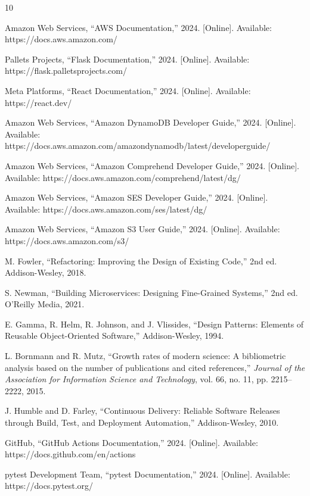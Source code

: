 \documentclass[conference]{IEEEtran}
\begin{document}
\begin{thebibliography}{10}

Amazon Web Services, ``AWS Documentation,'' 2024. [Online]. Available: https://docs.aws.amazon.com/

Pallets Projects, ``Flask Documentation,'' 2024. [Online]. Available: https://flask.palletsprojects.com/

Meta Platforms, ``React Documentation,'' 2024. [Online]. Available: https://react.dev/

Amazon Web Services, ``Amazon DynamoDB Developer Guide,'' 2024. [Online]. Available: https://docs.aws.amazon.com/amazondynamodb/latest/developerguide/

Amazon Web Services, ``Amazon Comprehend Developer Guide,'' 2024. [Online]. Available: https://docs.aws.amazon.com/comprehend/latest/dg/

Amazon Web Services, ``Amazon SES Developer Guide,'' 2024. [Online]. Available: https://docs.aws.amazon.com/ses/latest/dg/

Amazon Web Services, ``Amazon S3 User Guide,'' 2024. [Online]. Available: https://docs.aws.amazon.com/s3/

M. Fowler, ``Refactoring: Improving the Design of Existing Code,'' 2nd ed. Addison-Wesley, 2018.

S. Newman, ``Building Microservices: Designing Fine-Grained Systems,'' 2nd ed. O'Reilly Media, 2021.

E. Gamma, R. Helm, R. Johnson, and J. Vlissides, ``Design Patterns: Elements of Reusable Object-Oriented Software,'' Addison-Wesley, 1994.

L. Bornmann and R. Mutz, ``Growth rates of modern science: A bibliometric analysis based on the number of publications and cited references,'' \textit{Journal of the Association for Information Science and Technology}, vol. 66, no. 11, pp. 2215--2222, 2015.

J. Humble and D. Farley, ``Continuous Delivery: Reliable Software Releases through Build, Test, and Deployment Automation,'' Addison-Wesley, 2010.

GitHub, ``GitHub Actions Documentation,'' 2024. [Online]. Available: https://docs.github.com/en/actions

pytest Development Team, ``pytest Documentation,'' 2024. [Online]. Available: https://docs.pytest.org/

\end{thebibliography}
\end{document}
